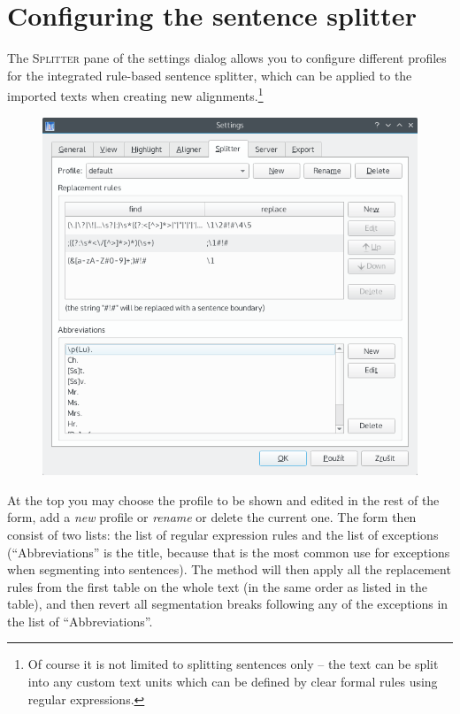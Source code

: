 \documentclass[a4paper,10pt,oneside]{book}
\newcommand{\menu}[1]{\textsc{#1}}
\begin{document}
\section{Configuring the sentence splitter}\label{ch:detail:config:splitter}

The \menu{Splitter} pane of the settings dialog allows you to configure different profiles for the integrated rule-based sentence splitter, which can be applied to the imported texts when creating new alignments.\footnote{Of course it is not limited to splitting sentences only -- the text can be split into any custom text units which can be defined by clear formal rules using regular expressions.}

\begin{figure}[htb]
 \includegraphics[width=\textwidth]{screenshots/settings_splitter.png}
\end{figure}

At the top you may choose the profile to be shown and edited in the rest of the form, add a \emph{new} profile or \emph{rename} or delete the current one. The form then consist of two lists: the list of regular expression rules and the list of exceptions (``Abbreviations'' is the title, because that is the most common use for exceptions when segmenting into sentences). The method will then apply all the replacement rules from the first table on the whole text (in the same order as listed in the table), and then revert all segmentation breaks following any of the exceptions in the list of ``Abbreviations''.
\end{document}
